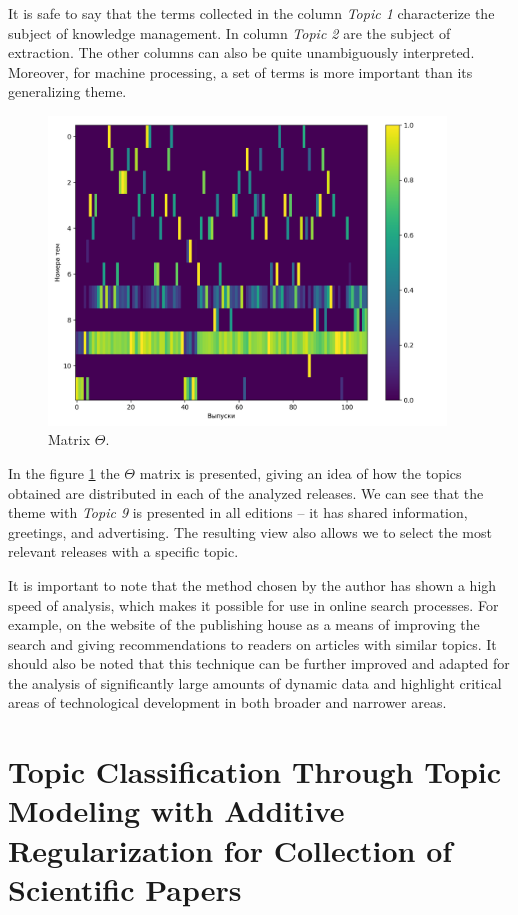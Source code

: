 \documentclass[12pt]{report}
\theoremstyle{definition}
\begin{document}
It is safe to say that the terms collected in the column \textit{Topic 1} characterize the subject of knowledge management. 
In column \textit{Topic 2} are the subject of extraction. 
The other columns can also be quite unambiguously interpreted. 
Moreover, for machine processing, a set of terms is more important than its generalizing theme.

\begin{figure}[H]
	\centering
	\includegraphics[width=0.94\textwidth]{nx4}
	\caption{Matrix $\Theta$.}
	\label{fig:nx4}
\end{figure} 

In the figure \ref{fig:nx4} the $\Theta$ matrix is presented, giving an idea of how the topics obtained are distributed in each of the analyzed releases. 
We can see that the theme with \textit{Topic 9}  is presented in all editions  – it has shared information, greetings, and advertising. 
The resulting view also allows we to select the most relevant releases with a specific topic. 

It is important to note that the method chosen by the author has shown a high speed of analysis, which makes it possible for use in online search processes. 
For example, on the website of the publishing house as a means of improving the search and giving recommendations to readers on articles with similar topics. 
It should also be noted that this technique can be further improved and adapted for the analysis of significantly large amounts of dynamic data and highlight critical areas of technological development in both broader and narrower areas.

\section{Topic Classification Through Topic Modeling with Additive Regularization for Collection of Scientific Papers}
\end{document}
